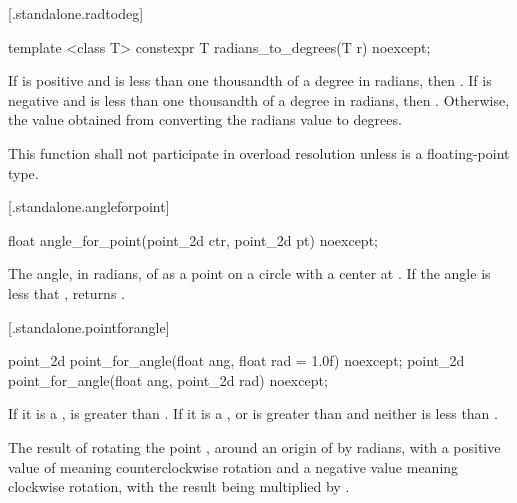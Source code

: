  [\iotwod.standalone.radtodeg] {}
\begin{itemdecl}
template <class T>
constexpr T radians_to_degrees(T r) noexcept;
\end{itemdecl}
\begin{itemdescr}
\returns
If  is positive and is less than one thousandth of a degree in radians, then . If  is negative and is less than one thousandth of a degree in radians, then . Otherwise, the value obtained from converting the radians value  to degrees.

\remarks
This function shall not participate in overload resolution unless  is a floating-point type.
\end{itemdescr}

 [\iotwod.standalone.angleforpoint] {}

%
\begin{itemdecl}
float angle_for_point(point_2d ctr, point_2d pt) noexcept;
\end{itemdecl}
\begin{itemdescr}
\pnum
\returns
The angle, in radians, of  as a point on a circle with a center at . If the angle is less that , returns .
\end{itemdescr}

 [\iotwod.standalone.pointforangle] {}

%
\begin{itemdecl}
point_2d point_for_angle(float ang, float rad = 1.0f) noexcept;
point_2d point_for_angle(float ang, point_2d rad) noexcept;
\end{itemdecl}
\begin{itemdescr}
\pnum
\requires
If it is a ,  is greater than . If it is a ,  or  is greater than  and neither is less than .

\pnum
\returns
The result of rotating the point , around an origin of  by  radians, with a positive value of  meaning counterclockwise rotation and a negative value meaning clockwise rotation, with the result being multiplied by .
\end{itemdescr}

